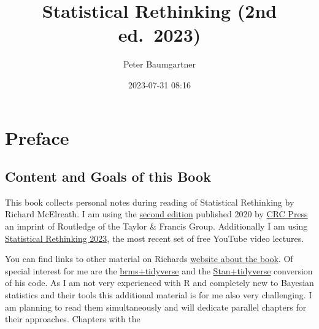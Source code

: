 \documentclass[
  letterpaper,
  DIV=11,
  numbers=noendperiod]{scrreprt}
\title{Statistical Rethinking (2nd ed.~2023)}
\author{Peter Baumgartner}
\date{2023-07-31 08:16}
\renewcommand*\contentsname{Table of contents}
\newcommand\contentsname{Table of contents}
\begin{document}
\maketitle
\renewcommand*\contentsname{Table of contents}
{
\hypersetup{linkcolor=}
\setcounter{tocdepth}{2}
\tableofcontents
}

\hypertarget{preface}{%
\chapter*{Preface}\label{preface}}


\begin{tcolorbox}[enhanced jigsaw, colframe=quarto-callout-note-color-frame, colback=white, toprule=.15mm, breakable, arc=.35mm, bottomtitle=1mm, colbacktitle=quarto-callout-note-color!10!white, toptitle=1mm, titlerule=0mm, title=\textcolor{quarto-callout-note-color}{\faInfo}\hspace{0.5em}{Finished about 15\%}, leftrule=.75mm, opacityback=0, rightrule=.15mm, opacitybacktitle=0.6, bottomrule=.15mm, left=2mm, coltitle=black]

\end{tcolorbox}

\hypertarget{content-and-goals-of-this-book}{%
\section*{Content and Goals of this
Book}\label{content-and-goals-of-this-book}}


This book collects personal notes during reading of Statistical
Rethinking by Richard McElreath. I am using the
\href{https://www.routledge.com/Statistical-Rethinking-A-Bayesian-Course-with-Examples-in-R-and-STAN/McElreath/p/book/9780367139919}{second
edition} published 2020 by
\href{https://en.wikipedia.org/wiki/CRC_Press}{CRC Press} an imprint of
Routledge of the Taylor \& Francis Group. Additionally I am using
\href{https://www.youtube.com/playlist?list=PLDcUM9US4XdPz-KxHM4XHt7uUVGWWVSus}{Statistical
Rethinking 2023}, the most recent set of free YouTube video lectures.

You can find links to other material on Richards
\href{https://xcelab.net/rm/statistical-rethinking/}{website about the
book}. Of special interest for me are the
\href{https://bookdown.org/content/4857/}{brms+tidyverse} and the
\href{https://vincentarelbundock.github.io/rethinking2/}{Stan+tidyverse}
conversion of his code. As I am not very experienced with R and
completely new to Bayesian statistics and their tools this additional
material is for me also very challenging. I am planning to read them
simultaneously and will dedicate parallel chapters for their approaches.
Chapters with the
\end{document}

